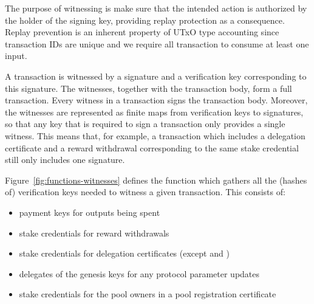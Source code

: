 The purpose of witnessing is make sure that the intended action is authorized by
the holder of the signing key, providing replay protection as a consequence.
Replay prevention is an inherent property of UTxO type accounting
since transaction IDs are unique and we require all transaction to
consume at least one input.

A transaction is witnessed by a signature and a verification key corresponding
to this signature.  The witnesses, together with the transaction body, form a
full transaction.  Every witness in a transaction signs the transaction body.
Moreover, the witnesses are represented as finite maps from verification keys to
signatures, so that any key that is required to sign a transaction only provides
a single witness.  This means that, for example, a transaction which includes a
delegation certificate and a reward withdrawal corresponding to the same stake
credential still only includes one signature.

Figure~\ref{fig:functions-witnesses} defines the function which
gathers all the (hashes of) verification keys needed to witness a given transaction.
This consists of:
\begin{itemize}
  \item payment keys for outputs being spent
  \item stake credentials for reward withdrawals
  \item stake credentials for delegation certificates (except \DCertMir{} and \DCertRegKey{})
  \item delegates of the genesis keys for any protocol parameter updates
  \item stake credentials for the pool owners in a pool registration certificate
\end{itemize}

